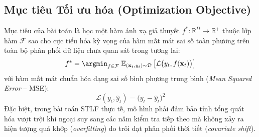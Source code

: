 \subsection{Mục tiêu Tối ưu hóa (Optimization Objective)}
Mục tiêu của bài toán là học một hàm ánh xạ giả thuyết $f^*: \mathbb{R}^D \to \mathbb{R}^+$ thuộc lớp hàm $\mathcal{F}$ sao cho cực tiểu hóa kỳ vọng của hàm mất mát sai số toàn phương trên toàn bộ phân phối dữ liệu chưa quan sát trong tương lai:
\begin{equation}
    f^* = \argmin_{f \in \mathcal{F}} \; \mathbb{E}_{(\mathbf{x}_t, y_t) \sim \mathcal{D}} \left[ \mathcal{L}\big(y_t, f(\mathbf{x}_t)\big) \right]
\end{equation}
với hàm mất mát chuẩn hóa dạng sai số bình phương trung bình (\textit{Mean Squared Error} -- MSE):
\begin{equation}
    \mathcal{L}(y_t, \hat{y}_t) = \big(y_t - \hat{y}_t\big)^2
\end{equation}
Đặc biệt, trong bài toán STLF thực tế, mô hình phải đảm bảo tính tổng quát hóa vượt trội khi ngoại suy sang các năm kiểm tra tiếp theo mà không xảy ra hiện tượng quá khớp (\textit{overfitting}) do trôi dạt phân phối thời tiết (\textit{covariate shift}).

